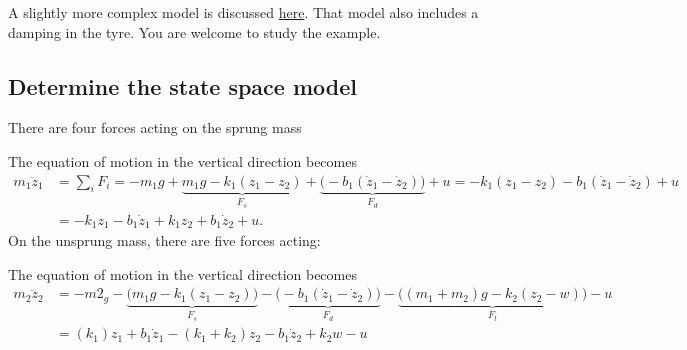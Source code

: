\documentclass[a4paper]{scrartcl}
\begin{document}
A slightly more complex model is discussed \href{http://ctms.engin.umich.edu/CTMS/index.php?example=Suspension&section=ControlStateSpace}{here}. That model also includes a damping in the tyre. You are welcome to study the example. 

\subsection*{Determine the state space model}
\label{sec-2-1}
There are four forces acting on the sprung mass
\begin{center}
\end{center}
The equation of motion in the vertical direction becomes
\begin{equation}
 \begin{split}
 m_1 \ddot{z}_1 &= \sum_i F_i = -m_1g + \underbrace{m_1g -k_1(z_1-z_2)}_{F_s} + \underbrace{\big(-b_1(\dot{z}_1 - \dot{z}_2) \big) }_{F_d} + u  = -k_1(z_1 - z_2) - b_1(\dot{z}_1 - \dot{z}_2) + u\\
                &= -k_1z_1 -b_1\dot{z}_1 + k_1z_2 + b_1\dot{z}_2 + u. 
 \end{split}
 \label{eq:eom1}
 \end{equation}
On the unsprung mass, there are five forces acting:
\begin{center}
\end{center}
The equation of motion in the vertical direction becomes
\begin{equation}
\begin{split}
m_2\ddot{z}_2 &= -m2_g - \underbrace{\big(m_1g -k_1(z_1-z_2)\big)}_{F_s}
 - \underbrace{\big(- b_1(\dot{z}_1-\dot{z}_2)\big)}_{F_d}
 - \underbrace{\big( (m_1 + m_2)g - k_2(z_2 - w) \big)}_{F_t} - u\\
               &= (k_1)z_1 + b_1\dot{z}_1 - (k_1+k_2)z_2 - b_1\dot{z}_2 + k_2w - u
 \end{split}
 \end{equation}
\end{document}
